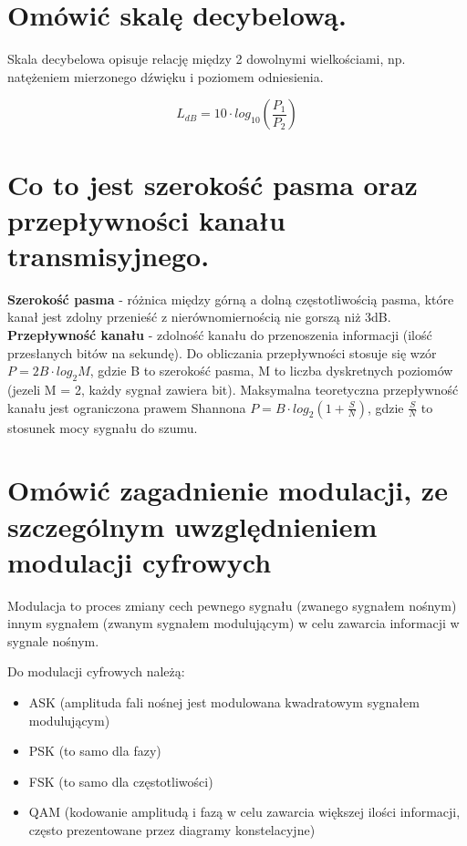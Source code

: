 \documentclass[12pt,a4paper]{article}
\begin{document}
	\section{Omówić skalę decybelową.}
	Skala decybelowa opisuje relację między 2 dowolnymi wielkościami, np. natężeniem mierzonego dźwięku i poziomem odniesienia.
	
	$$L_{dB} = 10 \cdot log_{10}\left( \frac{P_1}{P_2} \right) $$

	\section{Co to jest szerokość pasma oraz przepływności kanału transmisyjnego.}
	\textbf{Szerokość pasma} - różnica między górną a dolną częstotliwością pasma, które kanał jest zdolny przenieść z nierównomiernością nie gorszą niż 3dB.\\
	\textbf{Przepływność kanału} - zdolność kanału do przenoszenia informacji (ilość przesłanych bitów na sekundę). Do obliczania przepływności stosuje się wzór $P = 2B \cdot log_{2}M$, gdzie B to szerokość pasma, M to liczba dyskretnych poziomów (jezeli M = 2, każdy sygnał zawiera bit). Maksymalna teoretyczna przepływność kanału jest ograniczona prawem Shannona $P = B \cdot log_{2}\left( 1+ \frac{S}{N} \right)$, gdzie $\frac{S}{N}$ to stosunek mocy sygnału do szumu.

	\section{Omówić zagadnienie modulacji, ze szczególnym uwzględnieniem modulacji cyfrowych}
	Modulacja to proces zmiany cech pewnego sygnału (zwanego sygnałem nośnym) innym sygnałem (zwanym sygnałem modulującym) w celu zawarcia informacji w sygnale nośnym.
	
	Do modulacji cyfrowych należą: 
	\begin{itemize}
		\item ASK (amplituda fali nośnej jest modulowana kwadratowym sygnałem modulującym)
		\item PSK (to samo dla fazy)
		\item FSK (to samo dla częstotliwości)
		\item QAM (kodowanie amplitudą i fazą w celu zawarcia większej ilości informacji, często prezentowane przez diagramy konstelacyjne)
	\end{itemize}
\end{document}
